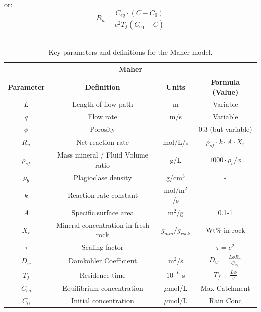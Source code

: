 or:\\

\begin{equation}
    R_n = \frac{C_{eq} \cdot \left(C - C_0\right)}{e^2 T_f \left( C_{\text{eq}} - C \right)}
\end{equation}\\





\newpage


\begin{table}[h]
    \centering
    \renewcommand{\arraystretch}{1.3} %
    \begin{tabular}{|c|c|c|c|}
        \hline  %
        \multicolumn{4}{|c|}{\textbf{Maher}} \\  
        \hline
        \textbf{Parameter} & \textbf{Definition} & \textbf{Units} & \textbf{Formula (Value)} \\  
        $L$ & Length of flow path & m & Variable \\
        $q$ & Flow rate & m/s & Variable \\
        $\phi$ & Porosity & - & 0.3 (but variable) \\
        $R_n$ & Net reaction rate & mol/L/s & $\rho_{sf} \cdot k \cdot A \cdot X_r $ \\
        $\rho_{sf}$ & Mass mineral / Fluid Volume ratio & g/L & $1000 \cdot \rho_b / \phi$ \\
        $\rho_b$ & Plagioclase density & g/cm$^3$ & - \\
        $k$ & Reaction rate constant & mol/m$^2$/s & - \\
        $A$ & Specific surface area & m$^2$/g & 0.1-1 \\
        $X_r$ & Mineral concentration in fresh rock & $g_{min}/g_{rock}$& Wt\% in rock \\
        $\tau$ & Scaling factor & - & $\tau = e^2$ \\
        $D_w$ & Damkohler Coefficient & m$^2$/s & $D_w = \frac{L \phi R_n}{C_{\text{eq}}}$ \\
        $T_f$ & Residence time & $10^{-6}$ s & $T_f = \frac{L \phi}{q}$ \\
        $C_{eq}$ & Equilibrium concentration & $\mu$mol/L & Max Catchment \\
        $C_0$ & Initial concentration & $\mu$mol/L & Rain Conc \\
        \hline
    \end{tabular}
    \caption{Key parameters and definitions for the Maher model.}
    \label{tab:parameters2}
\end{table}


